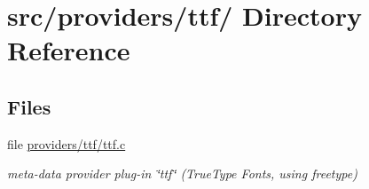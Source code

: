 \hypertarget{dir_000047}{
\section{src/providers/ttf/ Directory Reference}
\label{dir_000047}
}
\subsection*{Files}
\begin{CompactItemize}
\item 
file \hyperlink{providers_2ttf_2ttf_8c}{providers/ttf/ttf.c}
\begin{CompactList}\small\item\em meta-data provider plug-in \char`\"{}ttf\char`\"{} (True\-Type Fonts, using freetype) \item\end{CompactList}

\end{CompactItemize}
